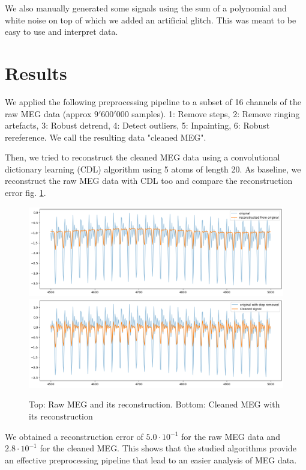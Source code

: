 \documentclass[11pt]{article}
\begin{document}
We also manually generated some signals using the sum of a polynomial and white noise on top of which we added an artificial glitch. This was meant to be easy to use and interpret data.\\ 

\section{Results}

We applied the following preprocessing pipeline to a subset of 16 channels of the raw MEG data (approx $9'600'000$ samples). 1: Remove steps, 2: Remove ringing artefacts, 3: Robust detrend, 4: Detect outliers, 5: Inpainting, 6: Robust rereference. We call the resulting data "cleaned MEG".

Then, we tried to reconstruct the cleaned MEG data using a convolutional dictionary learning (CDL) algorithm using 5 atoms of length 20. As baseline, we reconstruct the raw MEG data with CDL too and compare the reconstruction error fig. \ref{fig:recons}.

\begin{figure}
    \centering
    \includegraphics[width=.55\textwidth]{recons.png}\\
    \includegraphics[width=.55\textwidth]{recons_clean.png}
    \caption{Top: Raw MEG and its reconstruction. Bottom: Cleaned MEG with its reconstruction}
    \label{fig:recons}
\end{figure}

We obtained a reconstruction error of $5.0\cdot 10^{-1}$ for the raw MEG data and $2.8\cdot 10^{-1}$ for the cleaned MEG. This shows that the studied algorithms provide an effective preprocessing pipeline that lead to an easier analysis of MEG data.

\newpage

\printbibliography[heading=bibintoc]
\end{document}
